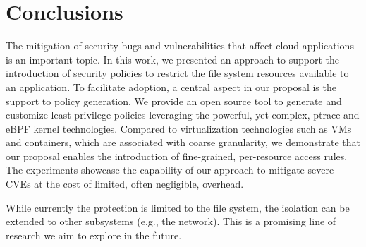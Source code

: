 \section{Conclusions}

The mitigation of security bugs and vulnerabilities that affect cloud
applications is an important topic. In this work, we presented an
approach to support the introduction of security policies to restrict
the file system resources available to an application. To facilitate
adoption, a central aspect in our proposal is the support to policy
generation. We provide an open source tool to generate and customize
least privilege policies leveraging the powerful, yet complex, ptrace
and eBPF kernel technologies.  Compared to virtualization technologies
such as VMs and containers, which are associated with coarse
granularity, we demonstrate that our proposal enables the introduction
of fine-grained, per-resource access rules. The experiments showcase
the capability of our approach to mitigate severe CVEs at the cost of
limited, often negligible, overhead.

While currently the protection is limited to the file system, the
isolation can be extended to other subsystems (e.g., the network).
This is a promising line of research we aim to explore in the future.

